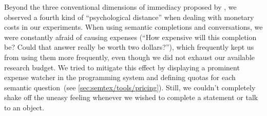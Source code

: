 Beyond the three conventional dimensions of immediacy proposed by \cite{ungar1997debugging}, we observed a fourth kind of ``psychological distance'' when dealing with monetary costs in our experiments.
When using semantic completions and conversations, we were constantly afraid of causing expenses (``How expensive will this completion be? Could that answer really be worth two dollars?''), which frequently kept us from using them more frequently, even though we did not exhaust our available research budget.
We tried to mitigate this effect by displaying a prominent expense watcher in the programming system and defining quotas for each semantic question~(see \cref{sec:semtex/tools/pricing}).
Still, we couldn't completely shake off the uneasy feeling whenever we wished to complete a statement or talk to an object.
